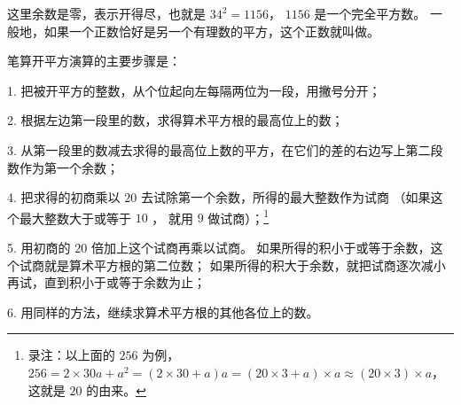 这里余数是零，表示开得尽，也就是 $34^2 = 1156$， $1156$ 是一个完全平方数。
一般地，如果一个正数恰好是另一个有理数的平方，这个正数就叫做。

笔算开平方演算的主要步骤是：

1. 把被开平方的整数，从个位起向左每隔两位为一段，用撇号分开；

2. 根据左边第一段里的数，求得算术平方根的最高位上的数；

3. 从第一段里的数减去求得的最高位上数的平方，在它们的差的右边写上第二段数作为第一个余数；

4. 把求得的初商乘以 $20$ 去试除第一个余数，所得的最大整数作为试商
（如果这个最大整数大于或等于 $10$ ， 就用 $9$ 做试商）；\footnote{录注：以上面的 $256$ 为例，
    $256 = 2 \times 30a + a^2 = (2 \times 30 + a)a = (20 \times 3 + a) \times a \approx (20 \times 3) \times a$，
    这就是 $20$ 的由来。
}

5. 用初商的 $20$ 倍加上这个试商再乘以试商。
如果所得的积小于或等于余数，这个试商就是算术平方根的第二位数；
如果所得的积大于余数，就把试商逐次减小再试，直到积小于或等于余数为止；

6. 用同样的方法，继续求算术平方根的其他各位上的数。


